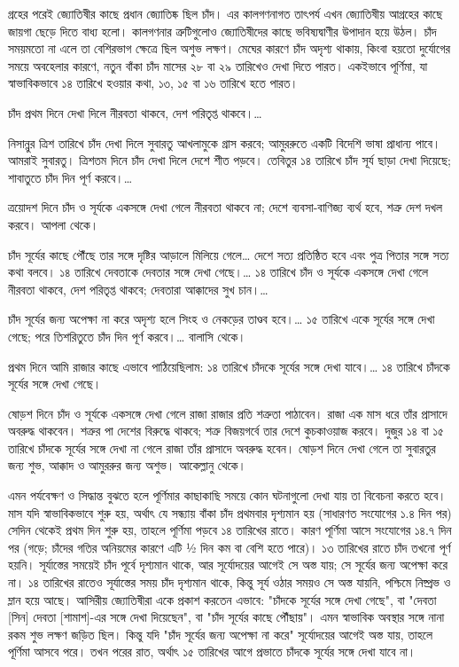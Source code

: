 গ্রহের পরেই জ্যোতিষীর কাছে প্রধান জ্যোতিষ্ক ছিল চাঁদ। এর কালগণনাগত তাৎপর্য এখন জ্যোতিষীয় আগ্রহের কাছে জায়গা ছেড়ে দিতে বাধ্য হলো। কালগণনার ত্রুটিগুলোও জ্যোতিষীদের কাছে ভবিষ্যদ্বাণীর উপাদান হয়ে উঠল। চাঁদ সময়মতো না এলে তা বেশিরভাগ ক্ষেত্রে ছিল অশুভ লক্ষণ। মেঘের কারণে চাঁদ অদৃশ্য থাকায়, কিংবা হয়তো দুর্যোগের সময়ে অবহেলার কারণে, নতুন বাঁকা চাঁদ মাসের ২৮ বা ২৯ তারিখেও দেখা দিতে পারত। একইভাবে পূর্ণিমা, যা স্বাভাবিকভাবে ১৪ তারিখে হওয়ার কথা, ১৩, ১৫ বা ১৬ তারিখে হতে পারত।

চাঁদ প্রথম দিনে দেখা দিলে নীরবতা থাকবে, দেশ পরিতৃপ্ত থাকবে।…

নিসান্নুর ত্রিশ তারিখে চাঁদ দেখা দিলে সুবারতু আখলামুকে গ্রাস করবে; আমুররুতে একটি বিদেশি ভাষা প্রাধান্য পাবে। আমরাই সুবারতু। ত্রিশতম দিনে চাঁদ দেখা দিলে দেশে শীত পড়বে। তেবিতুর ১৪ তারিখে চাঁদ সূর্য ছাড়া দেখা দিয়েছে; শাবাতুতে চাঁদ দিন পূর্ণ করবে।…

ত্রয়োদশ দিনে চাঁদ ও সূর্যকে একসঙ্গে দেখা গেলে নীরবতা থাকবে না; দেশে ব্যবসা-বাণিজ্য ব্যর্থ হবে, শত্রু দেশ দখল করবে। আপলা থেকে।

চাঁদ সূর্যের কাছে পৌঁছে তার সঙ্গে দৃষ্টির আড়ালে মিলিয়ে গেলে… দেশে সত্য প্রতিষ্ঠিত হবে এবং পুত্র পিতার সঙ্গে সত্য কথা বলবে। ১৪ তারিখে দেবতাকে দেবতার সঙ্গে দেখা গেছে।… ১৪ তারিখে চাঁদ ও সূর্যকে একসঙ্গে দেখা গেলে নীরবতা থাকবে, দেশ পরিতৃপ্ত থাকবে; দেবতারা আক্কাদের সুখ চান।…

চাঁদ সূর্যের জন্য অপেক্ষা না করে অদৃশ্য হলে সিংহ ও নেকড়ের তাণ্ডব হবে।… ১৫ তারিখে একে সূর্যের সঙ্গে দেখা গেছে; পরে তিশরিতুতে চাঁদ দিন পূর্ণ করবে।… বালাসি থেকে।

প্রথম দিনে আমি রাজার কাছে এভাবে পাঠিয়েছিলাম: ১৪ তারিখে চাঁদকে সূর্যের সঙ্গে দেখা যাবে।… ১৪ তারিখে চাঁদকে সূর্যের সঙ্গে দেখা গেছে।

ষোড়শ দিনে চাঁদ ও সূর্যকে একসঙ্গে দেখা গেলে রাজা রাজার প্রতি শত্রুতা পাঠাবেন। রাজা এক মাস ধরে তাঁর প্রাসাদে অবরুদ্ধ থাকবেন। শত্রুর পা দেশের বিরুদ্ধে থাকবে; শত্রু বিজয়গর্বে তার দেশে কুচকাওয়াজ করবে। দুজুর ১৪ বা ১৫ তারিখে চাঁদকে সূর্যের সঙ্গে দেখা না গেলে রাজা তাঁর প্রাসাদে অবরুদ্ধ হবেন। ষোড়শ দিনে দেখা গেলে তা সুবারতুর জন্য শুভ, আক্কাদ ও আমুররুর জন্য অশুভ। আকেল্লানু থেকে।

এমন পর্যবেক্ষণ ও সিদ্ধান্ত বুঝতে হলে পূর্ণিমার কাছাকাছি সময়ে কোন ঘটনাগুলো দেখা যায় তা বিবেচনা করতে হবে। মাস যদি স্বাভাবিকভাবে শুরু হয়, অর্থাৎ যে সন্ধ্যায় বাঁকা চাঁদ প্রথমবার দৃশ্যমান হয় (সাধারণত সংযোগের ১.৪ দিন পর) সেদিন থেকেই প্রথম দিন শুরু হয়, তাহলে পূর্ণিমা পড়বে ১৪ তারিখের রাতে। কারণ পূর্ণিমা আসে সংযোগের ১৪.৭ দিন পর (গড়ে; চাঁদের গতির অনিয়মের কারণে এটি ½ দিন কম বা বেশি হতে পারে)। ১৩ তারিখের রাতে চাঁদ তখনো পূর্ণ হয়নি। সূর্যাস্তের সময়েই চাঁদ পূর্বে দৃশ্যমান থাকে, আর সূর্যোদয়ের আগেই সে অস্ত যায়; সে সূর্যের জন্য অপেক্ষা করে না। ১৪ তারিখের রাতেও সূর্যাস্তের সময় চাঁদ দৃশ্যমান থাকে, কিন্তু সূর্য ওঠার সময়ও সে অস্ত যায়নি, পশ্চিমে নিষ্প্রভ ও ম্লান হয়ে আছে। আসিরীয় জ্যোতিষীরা একে প্রকাশ করতেন এভাবে: "চাঁদকে সূর্যের সঙ্গে দেখা গেছে", বা "দেবতা [সিন] দেবতা [শামাশ]-এর সঙ্গে দেখা দিয়েছেন", বা "চাঁদ সূর্যের কাছে পৌঁছায়"। এমন স্বাভাবিক অবস্থার সঙ্গে নানা রকম শুভ লক্ষণ জড়িত ছিল। কিন্তু যদি "চাঁদ সূর্যের জন্য অপেক্ষা না করে" সূর্যোদয়ের আগেই অস্ত যায়, তাহলে পূর্ণিমা আসবে পরে। তখন পরের রাত, অর্থাৎ ১৫ তারিখের আগে প্রভাতে চাঁদকে সূর্যের সঙ্গে দেখা যাবে না।

